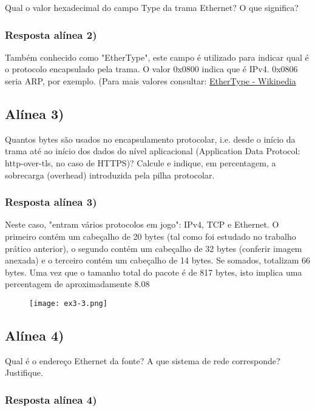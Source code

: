 \documentclass{article}
\begin{document}
Qual o valor hexadecimal do campo Type da trama Ethernet? O que significa?

\subsubsection{Resposta alínea 2)}

Também conhecido como "EtherType", este campo é utilizado para indicar qual é o protocolo encapsulado pela trama. O valor 0x0800 indica que é IPv4. 0x0806 seria ARP, por exemplo. (Para mais valores consultar: \href{https://en.wikipedia.org/wiki/EtherType}{EtherType - Wikipedia}

\pagebreak

\subsection{Alínea 3)}

Quantos bytes são usados no encapsulamento protocolar, i.e. desde o início da trama até ao início dos dados do nível
aplicacional (Application Data Protocol: http-over-tls, no caso de HTTPS)? Calcule e indique, em percentagem, a
sobrecarga (overhead) introduzida pela pilha protocolar.

\subsubsection{Resposta alínea 3)}

Neste caso, "entram vários protocolos em jogo": IPv4, TCP e Ethernet. O primeiro contém um cabeçalho de 20 bytes (tal como foi estudado no trabalho prático anterior), o segundo contém um cabeçalho de 32 bytes (conferir imagem anexada) e o terceiro contém um cabeçalho de 14 bytes. 
Se somados, totalizam 66 bytes. Uma vez que o tamanho total do pacote é de 817 bytes, isto implica uma percentagem de aproximadamente 8.08%

\begin{figure}[h!]
    \centering
    \texttt{[image: ex3-3.png]}
\end{figure}

\subsection{Alínea 4)}

Qual é o endereço Ethernet da fonte? A que sistema de rede corresponde? Justifique.

\subsubsection{Resposta alínea 4)}
\end{document}
